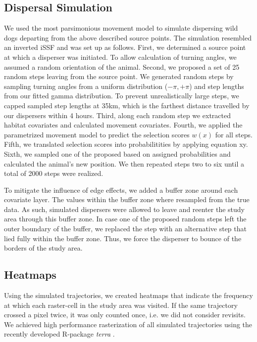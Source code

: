 \documentclass[abstract=on,10pt,a4paper,bibliography=totocnumbered]{article}
\begin{document}
\subsection{Dispersal Simulation}
We used the most parsimonious movement model to simulate dispersing wild dogs
departing from the above described source points. The simulation resembled an
inverted iSSF and was set up as follows. First, we determined a source point at
which a disperser was initiated. To allow calculation of turning angles, we
assumed a random orientation of the animal. Second, we proposed a set of 25
random steps leaving from the source point. We generated random steps by
sampling turning angles from a uniform distribution (\(-\pi, +\pi\)) and step
lengths from our fitted gamma distribution. To prevent unrealistically large
steps, we capped sampled step lengths at 35km, which is the farthest distance
travelled by our dispersers within 4 hours. Third, along each random step we
extracted habitat covariates and calculated movement covariates. Fourth, we
applied the parametrized movement model to predict the selection scores \(w(x)\)
for all steps. Fifth, we translated selection scores into probabilitities by
applying equation xy. Sixth, we sampled one of the proposed based on assigned
probabilities and calculated the animal's new position. We then repeated steps
two to six until a total of 2000 steps were realized.

To mitigate the influence of edge effects, we added a buffer zone around each
covariate layer. The values within the buffer zone where resampled from the true
data. As such, simulated dispersers were allowed to leave and reenter the study
area through this buffer zone. In case one of the proposed random steps left the
outer boundary of the buffer, we replaced the step with an alternative step that
lied fully within the buffer zone. Thus, we force the disperser to bounce of the
borders of the study area.

\subsection{Heatmaps}
Using the simulated trajectories, we created heatmaps that indicate the
frequency at which each raster-cell in the study area was visited. If the same
trajectory crossed a pixel twice, it was only counted once, i.e. we did not
consider revisits. We achieved high performance rasterization of all simulated
trajectories using the recently developed R-package \textit{terra}
\citep{Hijmans.2020}.
\end{document}
